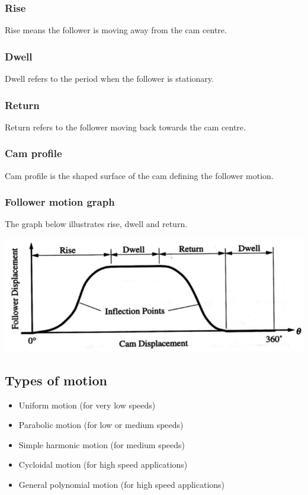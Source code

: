 \documentclass[11pt]{article}
\begin{document}
\subsubsection{Rise}
\label{sec:org4a026b8}
Rise means the follower is moving away from the cam centre.
\subsubsection{Dwell}
\label{sec:org8f95b00}
Dwell refers to the period when the follower is stationary.
\subsubsection{Return}
\label{sec:org2782f9f}
Return refers to the follower moving back towards the cam centre.
\subsubsection{Cam profile}
\label{sec:orgcf4c8ac}
Cam profile is the shaped surface of the cam defining the follower motion.
\subsubsection{Follower motion graph}
\label{sec:org13491a0}
The graph below illustrates rise, dwell and return.
\begin{center}
\includegraphics[width=.9\linewidth]{./images/motion-of-a-follower-graph.png}
\end{center}
\subsection{Types of motion}
\label{sec:orgda22a6a}
\begin{itemize}
\item Uniform motion (for very low speeds)
\item Parabolic motion (for low or medium speeds)
\item Simple harmonic motion (for medium speeds)
\item Cycloidal motion (for high speed applications)
\item General polynomial motion (for high speed applications)
\end{itemize}
\end{document}

